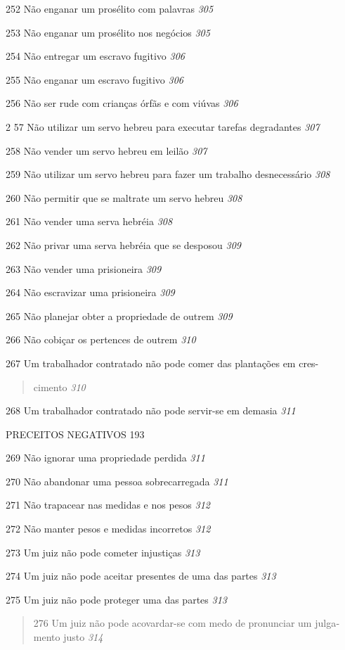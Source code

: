 252 Não enganar um prosélito com palavras \emph{305}

253 Não enganar um prosélito nos negócios \emph{305}

254 Não entregar um escravo fugitivo \emph{306}

255 Não enganar um escravo fugitivo \emph{306}

256 Não ser rude com crianças órfãs e com viúvas \emph{306}

2 57 Não utilizar um servo hebreu para executar tarefas degradantes
\emph{307}

258 Não vender um servo hebreu em leilão \emph{307}

259 Não utilizar um servo hebreu para fazer um trabalho desnecessário
\emph{308}

260 Não permitir que se maltrate um servo hebreu \emph{308}

261 Não vender uma serva hebréia \emph{308}

262 Não privar uma serva hebréia que se desposou \emph{309}

263 Não vender uma prisioneira \emph{309}

264 Não escravizar uma prisioneira \emph{309}

265 Não planejar obter a propriedade de outrem \emph{309}

266 Não cobiçar os pertences de outrem \emph{310}

267 Um trabalhador contratado não pode comer das plantações em cres-

\begin{quote}
cimento \emph{310}
\end{quote}

268 Um trabalhador contratado não pode servir-se em demasia \emph{311}

PRECEITOS NEGATIVOS 193

269 Não ignorar uma propriedade perdida \emph{311}

270 Não abandonar uma pessoa sobrecarregada \emph{311}

271 Não trapacear nas medidas e nos pesos \emph{312}

272 Não manter pesos e medidas incorretos \emph{312}

273 Um juiz não pode cometer injustiças \emph{313}

274 Um juiz não pode aceitar presentes de uma das partes \emph{313}

275 Um juiz não pode proteger uma das partes \emph{313}

\begin{quote}
276 Um juiz não pode acovardar-se com medo de pronunciar um julga­mento
justo \emph{314}
\end{quote}

